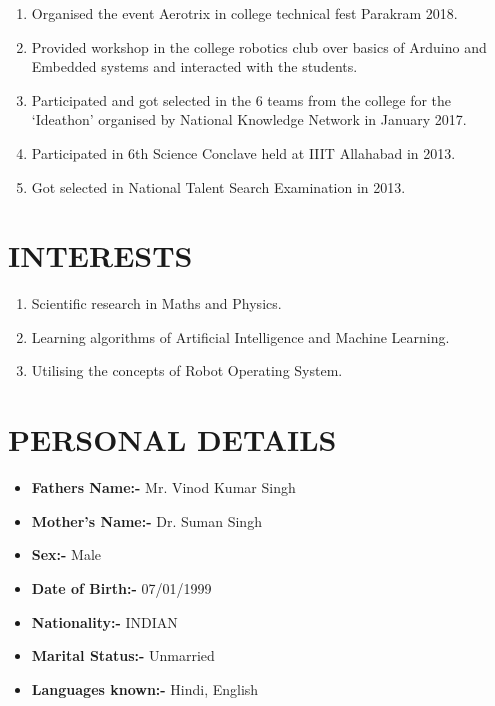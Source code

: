 \documentclass[margin,line]{res}
\begin{document}
\begin{resume}
\begin{enumerate}
\item Organised the event Aerotrix in college technical fest Parakram 2018.
\item Provided workshop in the college robotics club over basics of Arduino and Embedded systems and interacted with the students.
\item Participated and got selected in the 6 teams from the college for the ‘Ideathon’ organised by National Knowledge Network in January 2017.
\item Participated in 6th Science Conclave held at IIIT Allahabad in 2013.
\item Got selected in National Talent Search Examination in 2013.
\end{enumerate}\hfill
\section{\sc INTERESTS}
\begin{enumerate}
\item Scientific research in Maths and Physics.
\item Learning algorithms of Artificial Intelligence and Machine Learning.
\item Utilising the concepts of Robot Operating System.
\end{enumerate}
\section{\sc PERSONAL DETAILS}

\begin{itemize}
\item {\bf Fathers Name:-} Mr. Vinod Kumar Singh
\item {\bf Mother’s Name:-} Dr. Suman Singh
\item {\bf Sex:-} Male
\item {\bf Date of Birth:-} 07/01/1999
\item {\bf Nationality:-} INDIAN
\item {\bf Marital Status:-} Unmarried
\item {\bf Languages known:-} Hindi, English
\end{itemize}

\end{resume}
\end{document}
